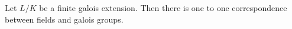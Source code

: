 \documentclass[../book.tex]{subfiles}
\begin{document}

\begin{thm}
Let $L/K$ be a finite galois extension. Then there is one to one correspondence between fields and galois groups.


\end{thm}
\end{document}
